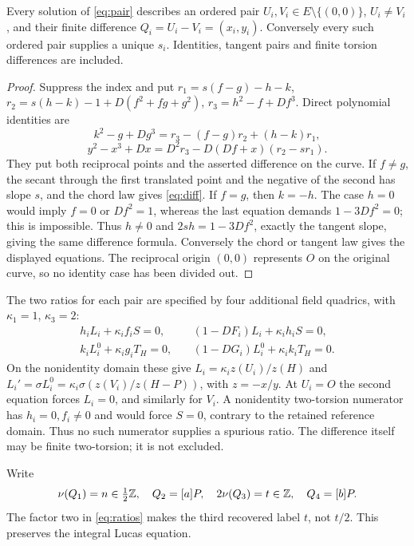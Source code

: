 \documentclass[11pt,a4paper]{article}
\begin{document}
\begin{lemma}\label{lem:pairs}
Every solution of \eqref{eq:pair} describes an ordered pair
$U_i,V_i\in E\setminus\{(0,0)\}$, $U_i\ne V_i$, and their finite
difference $Q_i=U_i-V_i=(x_i,y_i)$. Conversely every such ordered
pair supplies a unique $s_i$. Identities, tangent pairs and finite
torsion differences are included.
\end{lemma}
\begin{proof}
Suppress the index and put
$r_1=s(f-g)-h-k$, $r_2=s(h-k)-1+D(f^2+fg+g^2)$,
$r_3=h^2-f+Df^3$. Direct polynomial identities are
\[
 k^2-g+Dg^3=r_3-(f-g)r_2+(h-k)r_1,
\]
\[
 y^2-x^3+Dx=D^2r_3-D(Df+x)(r_2-sr_1).
\]
They put both reciprocal points and the asserted difference on the
curve. If $f\ne g$, the secant through the first translated point
and the negative of the second has slope $s$, and the chord law gives
\eqref{eq:diff}. If $f=g$, then $k=-h$. The case $h=0$ would imply
$f=0$ or $Df^2=1$, whereas the last equation demands $1-3Df^2=0$;
this is impossible. Thus $h\ne0$ and $2sh=1-3Df^2$, exactly the
tangent slope, giving the same difference formula. Conversely the
chord or tangent law gives the displayed equations. The reciprocal
origin $(0,0)$ represents $O$ on the original curve, so no identity
case has been divided out.
\end{proof}

The two ratios for each pair are specified by four additional field
quadrics, with $\kappa_1=1$, $\kappa_3=2$:
\begin{equation}\label{eq:ratios}
 \begin{split}
 h_iL_i+\kappa_i f_iS=0,&\quad
 (1-DF_i)L_i+\kappa_i h_iS=0,\\
 k_iL_i^0+\kappa_i g_iT_H=0,&\quad
 (1-DG_i)L_i^0+\kappa_i k_iT_H=0.
 \end{split}
\end{equation}
On the nonidentity domain these give
$L_i=\kappa_i z(U_i)/z(H)$ and
$L_i'=\sigma L_i^0=\kappa_i\sigma(z(V_i)/z(H-P))$, with $z=-x/y$.
At $U_i=O$ the second equation forces $L_i=0$, and similarly for $V_i$.
A nonidentity two-torsion numerator has $h_i=0,f_i\ne0$ and would
force $S=0$, contrary to the retained reference domain. Thus no such
numerator supplies a spurious ratio. The difference itself may be
finite two-torsion; it is not excluded.

Write
\[
 \nu(Q_1)=n\in\tfrac12\mathbb Z,\quad Q_2=[a]P,\quad
 2\nu(Q_3)=t\in\mathbb Z,\quad Q_4=[b]P.
\]
The factor two in \eqref{eq:ratios} makes the third recovered label
$t$, not $t/2$. This preserves the integral Lucas equation.
\end{document}
